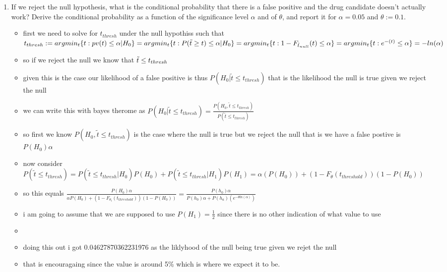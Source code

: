 \documentclass[12pt,twoside]{article}
\begin{document}
\begin{enumerate}
\begin{enumerate}
\item If we reject the null hypothesis, what is the conditional probability that there is a false positive and the drug candidate doesn't actually work? Derive the conditional probability as a function of the significance level $\alpha$ and of $\theta$, and report it for $\alpha = 0.05$ and $\theta:=0.1$. 
\begin{itemize}
  \color{blue}
  \item first we need to solve for $t_{thresh}$ under the null hypothiss such that $t_{thresh}:=argmin_{t}\{ t:pv(t)\leq \alpha | H_{0}\}=argmin_{t}\{ t:P(\Tilde{t}\geq t)\leq \alpha | H_{0}\}
  =argmin_{t}\{t:1-F_{\tilde{t}_{null}}(t)\leq \alpha\}=argmin_{t}\{t:e^{-(t)}\leq \alpha\}=-ln(\alpha)$
  \item so if we reject the null we know that $\Tilde{t}\leq t_{thresh}$
  \item given this is the case our likelihood of a false positive is thus $P(H_{0}|\tilde{t}\leq t_{thresh})$ that is the likelihood the null is true given we reject the null 
  \item we can write this with bayes therome as  $P(H_{0}|\tilde{t}\leq t_{thresh})=\frac{P(H_{0},\tilde{t}\leq t_{thresh})}{P(\tilde{t}\leq t_{thresh})}$
  \item so first we know $P(H_0, \tilde{t}\leq t_{thresh})$ is the case where the null is true but we reject the null that is we have a false postive is $P(H_0)\alpha$
  \item now consider $P(\tilde{t}\leq t_{thresh})=P(\tilde{t}\leq t_{thresh}|H_0)P(H_0)+P(\tilde{t}\leq t_{thresh}|H_1)P(H_1)=\alpha(P(H_0))+(1-F_{\theta}(t_{threshold}))(1-P(H_0))$
  \item so this equals $\frac{P(H_0)\alpha}{\alpha P(H_0)  +(1-F_{\theta_t}(t_{threshold}))(1-P(H_0)) }=\frac{P(h_0)\alpha
  }{P(h_0)\alpha + P(h_a)(e^{-\theta ln(\alpha)})}$  
  \item i am going to assume that we are supposed to use $P(H_1)=\frac{1}{2}$ since there is no other indication of what value to use 
    \item \inputminted[firstline=67, lastline=75, breaklines=True]{python}{hw7.py}
  \item doing this out i got 0.04627870362231976 as the liklyhood of the null being true  given we rejet the null
  \item that is encouragaing since the value is around 5\% which is where we expect it to be. 
\end{itemize}



\end{enumerate}
\end{enumerate}
\end{document}
